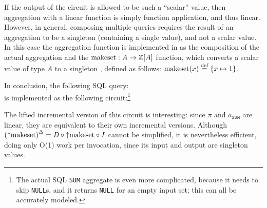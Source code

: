 If the output of the \dbsp circuit is allowed to be such a ``scalar'' value, then aggregation
with a linear function is simply function application, and thus linear.
However, in general, composing multiple queries
requires the result of an aggregation to be a singleton \zr (containing a single value),
and not a scalar value.  In this case the aggregation function is implemented in
\dbsp as the composition of the actual aggregation and the
$\mbox{makeset}: A \to \mathbb{Z}[A]$ function,
which converts a scalar value of type $A$ to a singleton \zr, defined as follows:
$\mbox{makeset}(x) \stackrel{\textrm{\scriptsize def}}{=} \{ x \mapsto 1 \}$.

In conclusion, the following SQL query: \\
is implemented as the following circuit:\footnote{The actual SQL \texttt{SUM} aggregate is
even more complicated, because it needs to skip \texttt{NULL}s,
and it returns \texttt{NULL} for an empty input set;
this can all be accurately modeled.}


The lifted incremental version of this circuit is interesting: since $\pi$
and $a_\texttt{SUM}$ are linear, they are equivalent to their own incremental
versions.  Although ${({\uparrow}\mbox{makeset})}^{\Delta} = \mathit{D} \circ {\uparrow}\mbox{makeset} \circ \mathit{I}$
cannot be simplified, it is nevertheless efficient, doing only O(1) work per
invocation, since its input and output are singleton values.


%

